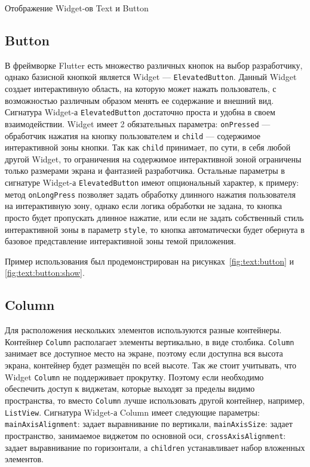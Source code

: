 \begin{image}
	\caption{Отображение Widget-ов Text и Button}
	\label{fig:text:button:show}
\end{image}

\subsection{Button}

В фреймворке Flutter есть множество различных кнопок на выбор разработчику,
однако базисной кнопкой является Widget --- \texttt{ElevatedButton}.
Данный Widget создает интерактивную область,
на которую может нажать пользователь,
с возможностью различным образом менять ее содержание и внешний вид.
Сигнатура Widget-а \texttt{ElevatedButton} достаточно проста
и удобна в своем взаимодействии.
Widget имеет 2 обязательных параметра: \texttt{onPressed}
--- обработчик нажатия на кнопку пользователем
и \texttt{child} --- содержимое интерактивной зоны кнопки.
Так как \texttt{child} принимает, по сути, в себя любой другой Widget,
то ограничения на содержимое интерактивной зоной ограничены только размерами
экрана и фантазией разработчика.
Остальные параметры в сигнатуре Widget-а \texttt{ElevatedButton}
имеют опциональный характер, к примеру:
метод \texttt{onLongPress} позволяет задать обработку длинного нажатия
пользователя на интерактивную зону, однако если логика обработки не задана,
то кнопка просто будет пропускать длинное нажатие,
или если не задать собственный стиль интерактивной зоны
в параметр \texttt{style}, то кнопка автоматически будет обернута
в базовое представление интерактивной зоны темой приложения.

Пример использования был продемонстрирован
на рисунках~\ref{fig:text:button} и \ref{fig:text:button:show}.

\subsection{Column}

Для расположения нескольких элементов используются разные контейнеры.
Контейнер \texttt{Column} располагает элементы вертикально, в виде столбика.
\texttt{Column} занимает все доступное место на экране,
поэтому если доступна вся высота экрана,
контейнер будет размещён по всей высоте.
Так же стоит учитывать, что Widget \texttt{Column} не поддерживает прокрутку.
Поэтому если необходимо обеспечить доступ к виджетам,
которые выходят за пределы видимо пространства,
то вместо \texttt{Column} лучше использовать другой контейнер, например,
\texttt{ListView}.
Сигнатура Widget-а Column имеет следующие параметры:
\texttt{mainAxisAlignment}: задает выравнивание по вертикали,
\texttt{mainAxisSize}: задает пространство,
занимаемое виджетом по основной оси,
\texttt{crossAxisAlignment}: задает выравнивание по горизонтали,
а \texttt{children} устанавливает набор вложенных элементов.

